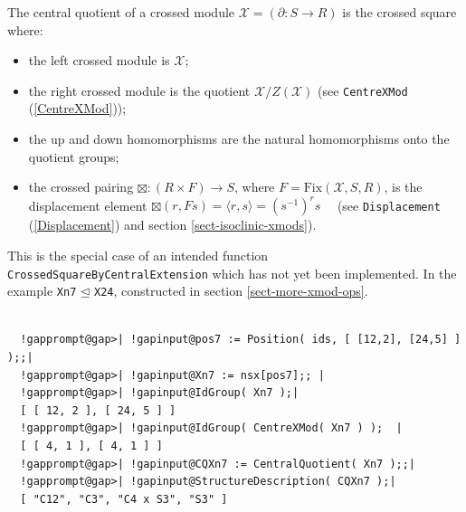 \documentclass[a4paper,11pt]{report}
\newcommand{\Fix} {\mathrm{Fix}}
\newcommand{\calX}{\mathcal{X}}
\begin{document}
{{{ The central quotient of a crossed module $\calX = (\partial : S \to R)$ is the crossed square where: 
\begin{itemize}
\item  the left crossed module is $\calX$; 
\item  the right crossed module is the quotient $\calX/Z(\calX)$ (see \texttt{CentreXMod} (\ref{CentreXMod})); 
\item  the up and down homomorphisms are the natural homomorphisms onto the quotient
groups; 
\item  the crossed pairing $\boxtimes : (R \times F) \to S$, where $F = \Fix(\calX,S,R)$, is the displacement element $\boxtimes(r,Fs) = \langle r,s \rangle = (s^{-1})^rs\quad$ (see \texttt{Displacement} (\ref{Displacement}) and section \ref{sect-isoclinic-xmods}). 
\end{itemize}
 This is the special case of an intended function \texttt{CrossedSquareByCentralExtension} which has not yet been implemented. In the example \texttt{Xn7} $\unlhd$ \texttt{X24}, constructed in section \ref{sect-more-xmod-ops}. }

 

 
\begin{Verbatim}[commandchars=!@|,fontsize=\small,frame=single,label=Example]
  
  !gapprompt@gap>| !gapinput@pos7 := Position( ids, [ [12,2], [24,5] ] );;|
  !gapprompt@gap>| !gapinput@Xn7 := nsx[pos7];; |
  !gapprompt@gap>| !gapinput@IdGroup( Xn7 );|
  [ [ 12, 2 ], [ 24, 5 ] ]
  !gapprompt@gap>| !gapinput@IdGroup( CentreXMod( Xn7 ) );  |
  [ [ 4, 1 ], [ 4, 1 ] ]
  !gapprompt@gap>| !gapinput@CQXn7 := CentralQuotient( Xn7 );;|
  !gapprompt@gap>| !gapinput@StructureDescription( CQXn7 );|
  [ "C12", "C3", "C4 x S3", "S3" ]
  
\end{Verbatim}
 

}}
\end{document}
